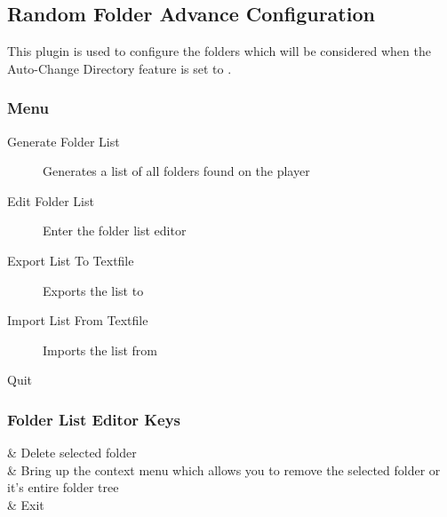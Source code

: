 \subsection{Random Folder Advance Configuration}
{\label{ref:random_folder_advance_config}}
This plugin is used to configure the folders which will be considered
when the Auto-Change Directory feature is set to .

\subsubsection{Menu}
\begin{description}
\item[Generate Folder List] Generates a list of all folders found 
on the player
\item[Edit Folder List] Enter the folder list editor
\item[Export List To Textfile] Exports the list to 
\item[Import List From Textfile] Imports the list from
\item[Quit]
\end{description}

\subsubsection{Folder List Editor Keys}
\begin{table}
\begin{btnmap}{}{}
	\ActionStdOk{} & Delete selected folder\\
	\ActionStdContext{} & Bring up the context menu which allows you to
	remove the selected folder or it's entire folder tree\\
	\ActionStdCancel{} & Exit\\
\end{btnmap}
\end{table}
